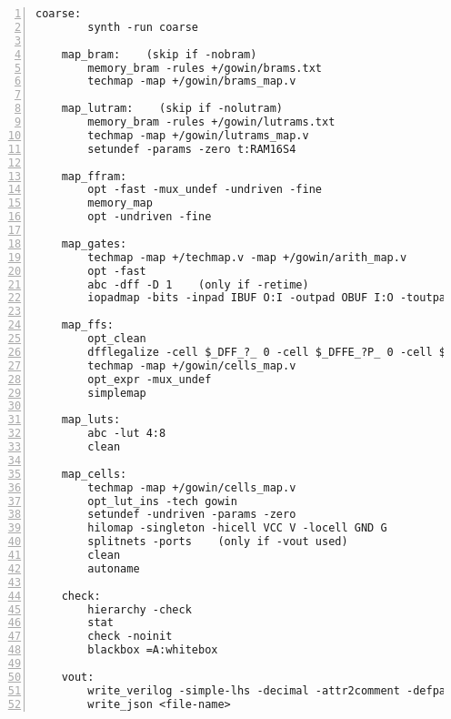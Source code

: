 \begin{lstlisting}[numbers=left,frame=single]
    coarse:
        synth -run coarse

    map_bram:    (skip if -nobram)
        memory_bram -rules +/gowin/brams.txt
        techmap -map +/gowin/brams_map.v

    map_lutram:    (skip if -nolutram)
        memory_bram -rules +/gowin/lutrams.txt
        techmap -map +/gowin/lutrams_map.v
        setundef -params -zero t:RAM16S4

    map_ffram:
        opt -fast -mux_undef -undriven -fine
        memory_map
        opt -undriven -fine

    map_gates:
        techmap -map +/techmap.v -map +/gowin/arith_map.v
        opt -fast
        abc -dff -D 1    (only if -retime)
        iopadmap -bits -inpad IBUF O:I -outpad OBUF I:O -toutpad TBUF ~OEN:I:O -tinoutpad IOBUF ~OEN:O:I:IO    (unless -noiopads)

    map_ffs:
        opt_clean
        dfflegalize -cell $_DFF_?_ 0 -cell $_DFFE_?P_ 0 -cell $_SDFF_?P?_ r -cell $_SDFFE_?P?P_ r -cell $_DFF_?P?_ r -cell $_DFFE_?P?P_ r
        techmap -map +/gowin/cells_map.v
        opt_expr -mux_undef
        simplemap

    map_luts:
        abc -lut 4:8
        clean

    map_cells:
        techmap -map +/gowin/cells_map.v
        opt_lut_ins -tech gowin
        setundef -undriven -params -zero
        hilomap -singleton -hicell VCC V -locell GND G
        splitnets -ports    (only if -vout used)
        clean
        autoname

    check:
        hierarchy -check
        stat
        check -noinit
        blackbox =A:whitebox

    vout:
        write_verilog -simple-lhs -decimal -attr2comment -defparam -renameprefix gen <file-name>
        write_json <file-name>
\end{lstlisting}

